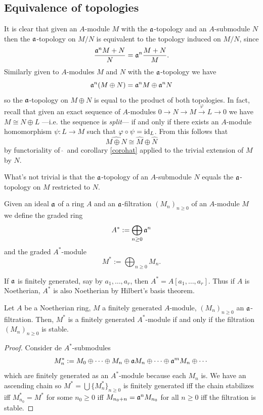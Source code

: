 \subsection{Equivalence of topologies}

It is clear that given an $A$-module $M$ with the $\mathfrak{a}$-topology and an $A$-submodule $N$ then the $\mathfrak{a}$-topology on $M/N$ is equivalent to the topology induced on $M/N$, since
\[
\frac{\mathfrak{a}^nM+N}{N}=\mathfrak{a}^n\frac{M+N}{M}.
\]
Similarly given to $A$-modules $M$ and $N$ with the $\mathfrak{a}$-topology we have
\[
\mathfrak{a}^n(M\oplus N)=\mathfrak{a}^n M\oplus \mathfrak{a}^n N
\]
so the $\mathfrak{a}$-topology on $M\oplus N$ is equal to the product of both topologies. In fact, recall that given an exact sequence of $A$-modules $0\to N\to M\overset{\varphi}{\to} L\to 0$ we have $M\cong N\oplus L$ ---i.e. the sequence is \emph{split}--- if and only if there exists an $A$-module homomorphism $\psi\colon L \to M$ such that $\varphi\circ\psi=\operatorname{id}_L$. From this follows that 
\begin{equation}\label{commoplus}
\widehat{M\oplus N}\cong \hat M\oplus \hat N
\end{equation}
by  functoriality of $\,\hat{}\,$ and corollary \ref{corohat} applied to the trivial extension of $M$ by $N$.


What's not trivial is that the $\mathfrak{a}$-topology of an $A$-submodule $N$ equals the $\mathfrak{a}$-topology on $M$ restricted to $N$. 

Given an ideal $\mathfrak{a}$ of a ring $A$ and an $\mathfrak{a}$-filtration $(M_n)_{n\geq 0}$ of an $A$-module $M$ we define the graded ring
\[
A^*:= \bigoplus_{n\geq 0}\mathfrak{a}^n
\]
and the graded $A^*$-module
\[
M^*:=\bigoplus_{n\geq 0} M_n.
\]

If $\mathfrak{a}$ is finitely generated, say by $a_1,\ldots,a_r$, then $A^*=A[a_1,\ldots,a_r]$. Thus if $A$ is Noetherian, $A^*$ is also Noetherian by Hilbert's basis theorem.

\begin{lem}\label{lemmaArtin}
    Let $A$ be a Noetherian ring, $M$ a finitely generated $A$-module, $(M_n)_{n\geq 0}$ an $\mathfrak{a}$-filtration. Then, $M^*$ is a finitely generated $A^*$-module if and only if the filtration $(M_n)_{n\geq 0}$ is stable.
\end{lem}
\begin{proof}
    Consider de $A^*$-submodules 
    \[
    M_n^*:=M_0\oplus \cdots \oplus M_n\oplus\mathfrak{a} M_n\oplus\cdots\oplus \mathfrak{a}^mM_n\oplus\cdots
    \]
    which are finitely generated as an $A^*$-module because each $M_n$ is. We have an ascending chain so $M^*=\bigcup \{M_n^*\}_{n\geq 0}$ is finitely generated iff the chain stabilizes iff $M_{n_0}^*=M^*$ for some $n_0\geq 0$ iff $M_{n_0+n}=\mathfrak{a}^nM_{n_0}$ for all $n\geq 0$ iff the filtration is stable.
\end{proof}

